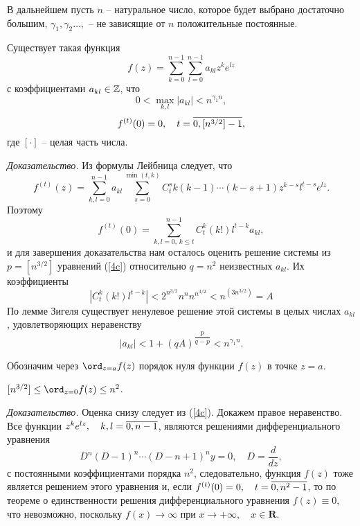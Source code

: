 В дальнейшем пусть $n$ -- натуральное число, которое будет выбрано
достаточно большим, $\gamma_1, \gamma_2 \dots, $ -- не зависящие
от $n$ положительные постоянные.

\begin{lemma}\label{L} Существует такая функция
\begin{equation}\label{4a}
f(z)=\sum_{k=0}^{n-1} \sum_{l=0}^{n-1} a_{kl}z^k e^{lz}
\end{equation} с коэффициентами $a_{kl} \in \Bbb Z$, что
\begin{equation}\label{4b}
 0 < \max_{k,l} |a_{kl}| < n^{\gamma_1n},
\end{equation}
\begin{equation}\label{4c}
f^{(t)}(0)=0, \quad t= \overline {0,[n^{3/2}]-1},
\end{equation}
где $[\cdot]$  -- целая часть числа.
 \end{lemma}

\emph{Доказательство.}  Из формулы Лейбница следует, что
\begin{equation}\label{5}
f^{(t)}(z)= \sum_{k,l=0}^{n-1}a_{kl} \sum_{s=0}^{\min (t,k)}C_t^s
k(k-1) \cdots (k-s+1) z^{k-s} l^{t-s} e^{lz}. \end{equation}
Поэтому
$$
f^{(t)}(0)=\sum_{k,l=0,\, k\le t}^{n-1}C_t^k(k!)l^{t-k}a_{kl},
$$
и для завершения доказательства нам осталось оценить решение
системы из $p=[n^{3/2}]$ уравнений (\ref{4c}) относительно $q=n^2$
неизвестных  $a_{kl}$. Их коэффициенты
$$
|C_t^k(k!)l^{t-k}|<2^{n^{3/2}}n^nn^{n^{3/2}}<n^{(3n^{3/2})}=A
$$
По лемме Зигеля существует ненулевое решение этой системы в целых
числах $a_{kl}$, удовлетворяющих неравенству
$$
|a_{kl}|<1+(qA)^{\dfrac p{q-p}}<n^{\gamma_1n}.
$$


Обозначим через $\ord_{z=a}f(z)$  порядок нуля функции $f(z)$  в
точке $z=a$.

\begin{lemma}\label{M}  $[n^{3/2}] \le \ord_{z=0}f(z) \le n^2$.
\end{lemma}

 \emph{Доказательство.}   Оценка снизу следует из (\ref{4c}).
Докажем правое неравенство.  Все функции $z^ke^{lz}, \quad k,l=
\overline{0,n-1}$, являются решениями дифференциального уравнения
$$
D^n(D-1)^n \cdots (D-n+1)^ny=0, \quad D=\frac d{dz},
$$
с постоянными коэффициентами порядка $n^2$, следовательно, функция
$f(z)$ тоже является решением этого уравнения и, если
$f^{(t)}(0)=0, \quad t=\overline{0,n^2-1}$, то по теореме о
единственности решения дифференциального уравнения  $f(z) \equiv
0$, что невозможно, поскольку $f(x) \to \infty$ при $x\to +\infty,
\quad x\in\mathbf  R$.



